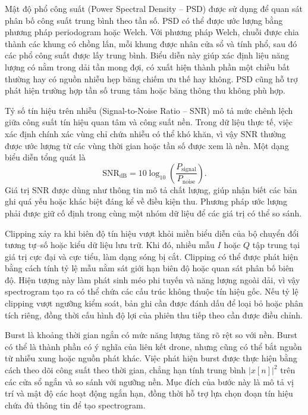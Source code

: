 \documentclass[../DoAn.tex]{subfiles}
\begin{document}
Mật độ phổ công suất (Power Spectral Density -- PSD) được sử dụng để quan sát phân bố công suất trung bình theo tần số. PSD có thể được ước lượng bằng phương pháp periodogram hoặc Welch. Với phương pháp Welch, chuỗi được chia thành các khung có chồng lấn, mỗi khung được nhân cửa sổ và tính phổ, sau đó các phổ công suất được lấy trung bình. Biểu diễn này giúp xác định liệu năng lượng có nằm trong dải tần mong đợi, có xuất hiện thành phần một chiều bất thường hay có nguồn nhiễu hẹp băng chiếm ưu thế hay không. PSD cũng hỗ trợ phát hiện trường hợp tần số trung tâm hoặc băng thông thu không phù hợp.

Tỷ số tín hiệu trên nhiễu (Signal-to-Noise Ratio -- SNR) mô tả mức chênh lệch giữa công suất tín hiệu quan tâm và công suất nền. Trong dữ liệu thực tế, việc xác định chính xác vùng chỉ chứa nhiễu có thể khó khăn, vì vậy SNR thường được ước lượng từ các vùng thời gian hoặc tần số được xem là nền. Một dạng biểu diễn tổng quát là
\begin{equation}
    \mathrm{SNR}_{\mathrm{dB}}
    =
    10\log_{10}
    \left(
        \frac{P_{\mathrm{signal}}}{P_{\mathrm{noise}}}
    \right).
\end{equation}
Giá trị SNR được dùng như thông tin mô tả chất lượng, giúp nhận biết các bản ghi quá yếu hoặc khác biệt đáng kể về điều kiện thu. Phương pháp ước lượng phải được giữ cố định trong cùng một nhóm dữ liệu để các giá trị có thể so sánh.

Clipping xảy ra khi biên độ tín hiệu vượt khỏi miền biểu diễn của bộ chuyển đổi tương tự--số hoặc kiểu dữ liệu lưu trữ. Khi đó, nhiều mẫu $I$ hoặc $Q$ tập trung tại giá trị cực đại và cực tiểu, làm dạng sóng bị cắt. Clipping có thể được phát hiện bằng cách tính tỷ lệ mẫu nằm sát giới hạn biên độ hoặc quan sát phân bố biên độ. Hiện tượng này làm phát sinh méo phi tuyến và năng lượng ngoài dải, vì vậy spectrogram tạo ra có thể chứa các cấu trúc không thuộc tín hiệu gốc. Nếu tỷ lệ clipping vượt ngưỡng kiểm soát, bản ghi cần được đánh dấu để loại bỏ hoặc phân tích riêng, đồng thời cấu hình độ lợi của phiên thu tiếp theo cần được điều chỉnh.

Burst là khoảng thời gian ngắn có mức năng lượng tăng rõ rệt so với nền. Burst có thể là thành phần có ý nghĩa của liên kết drone, nhưng cũng có thể bắt nguồn từ nhiễu xung hoặc nguồn phát khác. Việc phát hiện burst được thực hiện bằng cách theo dõi công suất theo thời gian, chẳng hạn tính trung bình $|x[n]|^2$ trên các cửa sổ ngắn và so sánh với ngưỡng nền. Mục đích của bước này là mô tả vị trí và mật độ các hoạt động ngắn hạn, đồng thời hỗ trợ lựa chọn đoạn tín hiệu chứa đủ thông tin để tạo spectrogram.
\end{document}
